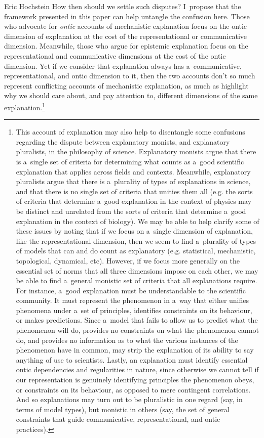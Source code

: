 \begin{artengenv}{Eric Hochstein}
How then should we settle such disputes? I~propose that the framework presented in this paper can help untangle the confusion here. Those who advocate for \textit{ontic} accounts of mechanistic explanation focus on the ontic dimension of explanation at the cost of the representational or communicative dimension. Meanwhile, those who argue for epistemic explanation focus on the representational and communicative dimensions at the cost of the ontic dimension. Yet if we consider that explanation always has a~communicative, representational, and ontic dimension to it, then the two accounts don't so much represent conflicting accounts of mechanistic explanation, as much as highlight why we should care about, and pay attention to, different dimensions of the same explanation.\footnote{This account of explanation may also help to disentangle some confusions regarding the dispute between explanatory monists, and explanatory pluralists, in the philosophy of science. Explanatory monists argue that there is a~single set of criteria for determining what counts as a~good scientific explanation that applies across fields and contexts. Meanwhile, explanatory pluralists argue that there is a~plurality of types of explanations in science, and that there is no single set of criteria that unities them all (e.g. the sorts of criteria that determine a~good explanation in the context of physics may be distinct and unrelated from the sorts of criteria that determine a~good explanation in the context of biology). We may be able to help clarify some of these issues by noting that if we focus on a~single dimension of explanation, like the representational dimension, then we seem to find a~plurality of types of models that can and do count as explanatory (e.g. statistical, mechanistic, topological, dynamical, etc). However, if we focus more generally on the essential set of norms that all three dimensions impose on each other, we may be able to find a~general monistic set of criteria that all explanations require. For instance, a~good explanation must be understandable to the scientific community. It must represent the phenomenon in a~way that either unifies phenomena under a~set of principles, identifies constraints on its behaviour, or makes predictions. Since a~model that fails to allow us to predict what the phenomenon will do, provides no constraints on what the phenomenon cannot do, and provides no information as to what the various instances of the phenomenon have in common, may strip the explanation of its ability to say anything of use to scientists. Lastly, an explanation must identify essential ontic dependencies and regularities in nature, since otherwise we cannot tell if our representation is genuinely identifying principles the phenomenon obeys, or constraints on its behaviour, as opposed to mere contingent correlations. And so explanations may turn out to be pluralistic in one regard (say, in terms of model types), but monistic in others (say, the set of general constraints that guide communicative, representational, and ontic practices).}


\end{artengenv}
